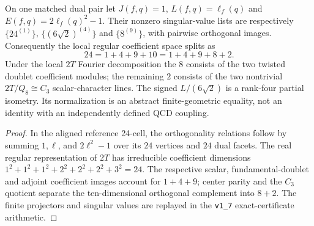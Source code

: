 \documentclass[11pt]{article}
\begin{document}
\begin{proposition}
\label{p1:prop:v366-hurwitz-fourier-filters}
On one matched dual pair let
$J(f,q)=1$, $L(f,q)=\ell_f(q)$ and $E(f,q)=2\ell_f(q)^2-1$.
Their nonzero singular-value lists are respectively
$\{24^{(1)}\}$, $\{(6\sqrt2)^{(4)}\}$ and
$\{8^{(9)}\}$, with pairwise orthogonal images.  Consequently the
local regular coefficient space splits as
\[
 \boxed{24=1+4+9+10=1+4+9+8+2}.
\]
Under the local $2T$ Fourier decomposition the $8$ consists of the
two twisted doublet coefficient modules; the remaining $2$ consists
of the two nontrivial $2T/Q_8\cong C_3$ scalar-character lines.
The signed $L/(6\sqrt2)$ is a rank-four partial isometry.  Its
normalization is an abstract finite-geometric equality, not an
identity with an independently defined QCD coupling.
\end{proposition}
\begin{proof}
In the aligned reference 24-cell, the orthogonality relations
follow by summing $1,\ell$, and $2\ell^2-1$ over its $24$ vertices
and $24$ dual facets.  The real regular representation of $2T$
has irreducible coefficient dimensions
$1^2+1^2+1^2+2^2+2^2+2^2+3^2=24$.
The respective scalar, fundamental-doublet and adjoint coefficient
images account for $1+4+9$; center parity and the $C_3$ quotient
separate the ten-dimensional orthogonal complement into $8+2$.
The finite projectors and singular values are replayed in the
\texttt{v1\_7} exact-certificate arithmetic.
\end{proof}
\end{document}
